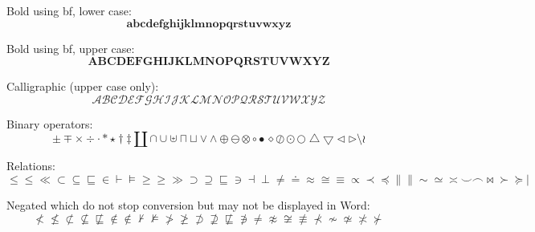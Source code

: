 Bold using bf, lower case:
\begin{dmath}[compact,spread={1.250000\baselineskip}] \mathbf{a}  \mathbf{b}  \mathbf{c}  \mathbf{d}  \mathbf{e}  \mathbf{f}  \mathbf{g}  \mathbf{h}  \mathbf{i}  \mathbf{j}  \mathbf{k}  \mathbf{l}  \mathbf{m}  \mathbf{n}  \mathbf{o}  \mathbf{p}  \mathbf{q}  \mathbf{r}  \mathbf{s}  \mathbf{t}  \mathbf{u}  \mathbf{v}  \mathbf{w}  \mathbf{x}  \mathbf{y}  \mathbf{z} \end{dmath}

Bold using bf, upper case:
\begin{dmath}[compact,spread={1.250000\baselineskip}] \mathbf{A}  \mathbf{B}  \mathbf{C}  \mathbf{D}  \mathbf{E}  \mathbf{F}  \mathbf{G}  \mathbf{H}  \mathbf{I}  \mathbf{J}  \mathbf{K}  \mathbf{L}  \mathbf{M}  \mathbf{N}  \mathbf{O}  \mathbf{P}  \mathbf{Q}  \mathbf{R}  \mathbf{S}  \mathbf{T}  \mathbf{U}  \mathbf{V}  \mathbf{W}  \mathbf{X}  \mathbf{Y}  \mathbf{Z} \end{dmath}

Calligraphic (upper case only):
\begin{dmath}[compact,spread={1.250000\baselineskip}] \mathcal{A}  \mathcal{B}  \mathcal{C}  \mathcal{D}  \mathcal{E}  \mathcal{F}  \mathcal{G}  \mathcal{H}  \mathcal{I}  \mathcal{J}  \mathcal{K}  \mathcal{L}  \mathcal{M}  \mathcal{N}  \mathcal{O}  \mathcal{P}  \mathcal{Q}  \mathcal{R}  \mathcal{S}  \mathcal{T}  \mathcal{U}  \mathcal{V}  \mathcal{W}  \mathcal{X}  \mathcal{Y}  \mathcal{Z} \end{dmath}

Binary operators:
\begin{dmath}[compact,spread={1.250000\baselineskip}] \pm \mp \times \div \cdot \ast \star \dagger \ddagger \amalg \cap \cup \uplus \sqcap \sqcup \vee \wedge \oplus \ominus \otimes \circ \bullet \diamond \oslash \odot \bigcirc \bigtriangleup \bigtriangledown \triangleleft \triangleright \setminus \wr \end{dmath}

Relations:
\begin{dmath}[compact,spread={1.250000\baselineskip}] \le \leq \ll \subset \subseteq \sqsubseteq \in \vdash \models \ge \geq \gg \supset \supseteq \sqsubseteq \ni \dashv \perp \neq \doteq \approx \cong \equiv \propto \prec \preceq \parallel \| \sim \simeq \asymp \smile \frown \bowtie \succ \succeq \mid \end{dmath}

Negated which do not stop conversion but may not be displayed in Word:
\begin{dmath}[compact,spread={1.250000\baselineskip}] \not< \not\leq \not\subset \not\subseteq \not\sqsubseteq \not\in \notin \not\vdash \not\models \not> \not\geq \not\supset \not\supseteq \not\sqsubseteq \not\ni \not= \not\approx \not\cong \not\equiv \not\prec \not\sim \not\simeq \not\asymp \not\succ  \end{dmath}

